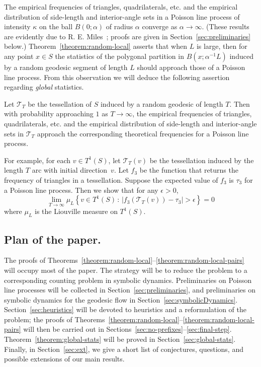 \documentclass[AHL, Unicode, longabstracts, published]{cedram}
\begin{document}
The empirical frequencies of triangles, quadrilaterals, etc. and the empirical distribution of side-length and interior-angle sets in a Poisson line process of intensity $\kappa$ on the ball $B (0; \alpha)$ of radius $\alpha$ converge as $\alpha \rightarrow \infty$. (These results are evidently due to R. E. Miles~\cite{miles:pnas1,miles:pnas2}; proofs are given in Section~\ref{sec:preliminaries} below.) Theorem~\ref{theorem:random-local} asserts that when $L$ is large, then for any point $x\in S$ the statistics of the polygonal partition in $B (x;\alpha^{-1}L)$ induced by a random geodesic segment of length $L$ should approach those of a Poisson line process. From this observation we will deduce the following assertion regarding \emph{global} statistics.


\begin{theo}\label{theorem:global-stats}
Let $\mathcal{T}_{T}$ be the tessellation of $S$ induced by a random geodesic of length $T$. Then with probability approaching $1$ as $T \rightarrow \infty$, the empirical frequencies of triangles, quadrilaterals, etc. and the empirical distribution of side-length and interior-angle sets in $\mathcal{T}_{T}$ approach the corresponding theoretical frequencies for a Poisson line process.
\end{theo}

For example, for each $v \in T^1(S)$, let $\mathcal T_T(v)$ be the tessellation induced by the length $T$ arc with initial direction~$v$. Let $f_3$ be the function that returns the frequency of triangles in a tessellation. Suppose the expected value of $f_3$ is $\tau_3$ for a Poisson line process. Then we show that for any $\epsilon > 0$,
\[
\lim_{T \to \infty} \mu_L \left\{v \in T^1(S) \,:\, |f_3(\mathcal T_T(v)) - \tau_3| > \epsilon\right\} = 0
\]
where $\mu_L$ is the Liouville measure on $T^1(S)$.

\subsection*{Plan of the paper.}
The proofs of Theorems~\ref{theorem:random-local}--\ref{theorem:random-local-pairs} will occupy most of the paper. The strategy will be to reduce the problem to a corresponding counting problem in symbolic dynamics. Preliminaries on Poisson line processes will be collected in Section~\ref{sec:preliminaries}, and preliminaries on symbolic dynamics for the geodesic flow in Section~\ref{sec:symbolicDynamics}. Section~\ref{sec:heuristics} will be devoted to heuristics and a reformulation of the problem; the proofs of Theorems~\ref{theorem:random-local}--\ref{theorem:random-local-pairs} will then be carried out in Sections~\ref{sec:no-prefixes}--\ref{sec:final-step}. Theorem~\ref{theorem:global-stats} will be proved in Section~\ref{sec:global-stats}. Finally, in Section~\ref{sec:ext}, we give a short list of conjectures, questions, and possible extensions of our main results.
\end{document}
